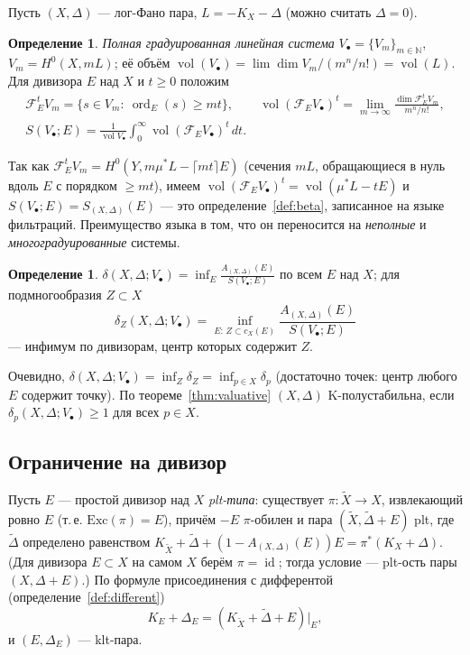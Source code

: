 \documentclass[11pt,a4paper]{article}
\theoremstyle{plain}
\theoremstyle{definition}
\newtheorem{definition}[theorem]{Определение}
\theoremstyle{remark}
\DeclareMathOperator{\ord}{ord}
\DeclareMathOperator{\id}{id}
\DeclareMathOperator{\vol}{vol}
\begin{document}
Пусть $(X,\Delta)$ --- лог-Фано пара, $L=-K_X-\Delta$ (можно считать $\Delta=0$).

\begin{definition}\label{def:graded-series}
\emph{Полная градуированная линейная система} $V_\bullet=\{V_m\}_{m\in\mathbb N}$, $V_m=H^0(X,mL)$;
её объём $\vol(V_\bullet)=\lim\dim V_m/(m^n/n!)=\vol(L)$. Для дивизора $E$ над $X$ и $t\ge0$ положим
\begin{gather*}
\mathcal F_E^tV_m=\{s\in V_m:\ \ord_E(s)\ge mt\},\qquad
\vol(\mathcal F_EV_\bullet)^t=\lim_{m\to\infty}\frac{\dim\mathcal F_E^tV_m}{m^n/n!},\\
S(V_\bullet;E)=\frac1{\vol V_\bullet}\int_0^\infty\vol(\mathcal F_EV_\bullet)^t\,dt .
\end{gather*}
\end{definition}

Так как $\mathcal F_E^tV_m=H^0(Y,m\mu^*L-\lceil mt\rceil E)$ (сечения $mL$, обращающиеся в нуль
вдоль $E$ с порядком $\ge mt$), имеем $\vol(\mathcal F_EV_\bullet)^t=\vol(\mu^*L-tE)$ и
$S(V_\bullet;E)=S_{(X,\Delta)}(E)$ --- это определение~\ref{def:beta}, записанное на языке фильтраций.
Преимущество языка в том, что он переносится на \emph{неполные} и \emph{многоградуированные} системы.

\begin{definition}
$\delta(X,\Delta;V_\bullet)=\inf_E\frac{A_{(X,\Delta)}(E)}{S(V_\bullet;E)}$ по всем $E$ над $X$;
для подмногообразия $Z\subset X$
\[
\delta_Z(X,\Delta;V_\bullet)=\inf_{E:\,Z\subset c_X(E)}\frac{A_{(X,\Delta)}(E)}{S(V_\bullet;E)}
\]
--- инфимум по дивизорам, центр которых содержит $Z$.
\end{definition}

Очевидно, $\delta(X,\Delta;V_\bullet)=\inf_Z\delta_Z=\inf_{p\in X}\delta_p$ (достаточно точек: центр
любого $E$ содержит точку). По теореме~\ref{thm:valuative} $(X,\Delta)$ K-полустабильна, если
$\delta_p(X,\Delta;V_\bullet)\ge1$ для всех $p\in X$.

\subsection{Ограничение на дивизор}

Пусть $E$ --- простой дивизор над $X$ \emph{plt-типа}: существует $\pi\colon\tilde X\to X$,
извлекающий ровно $E$ (т.\,е. $\mathrm{Exc}(\pi)=E$), причём $-E$ $\pi$-обилен и пара
$(\tilde X,\tilde\Delta+E)$ plt, где $\tilde\Delta$ определено равенством
$K_{\tilde X}+\tilde\Delta+(1-A_{(X,\Delta)}(E))E=\pi^*(K_X+\Delta)$. (Для дивизора $E\subset X$ на
самом $X$ берём $\pi=\id$; тогда условие --- plt-ость пары $(X,\Delta+E)$.) По формуле
присоединения с дифферентой (определение~\ref{def:different})
\[
K_E+\Delta_E=(K_{\tilde X}+\tilde\Delta+E)|_E ,
\]
и $(E,\Delta_E)$ --- klt-пара.
\end{document}
